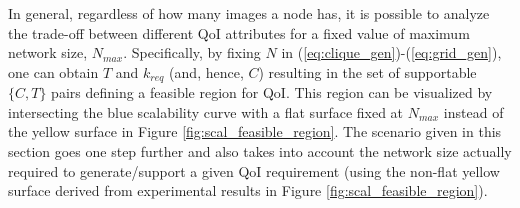 In general, regardless of how many images a node has, it is possible to analyze the trade-off between different QoI attributes for a fixed value of maximum network size, $N_{max}$.  Specifically, by fixing $N$ in (\ref{eq:clique_gen})-(\ref{eq:grid_gen}), one can obtain $T$ and $k_{req}$ (and, hence, $C$) resulting in the set of supportable $\{C,T\}$ pairs defining a feasible region for QoI. This region can be visualized by intersecting the blue scalability curve with a flat surface fixed at $N_{max}$ instead of the yellow surface in Figure \ref{fig:scal_feasible_region}.  The scenario given in this section goes one step further and also takes into account  the network size actually required to generate/support a given QoI requirement (using the non-flat yellow surface derived from experimental results in Figure \ref{fig:scal_feasible_region}).
